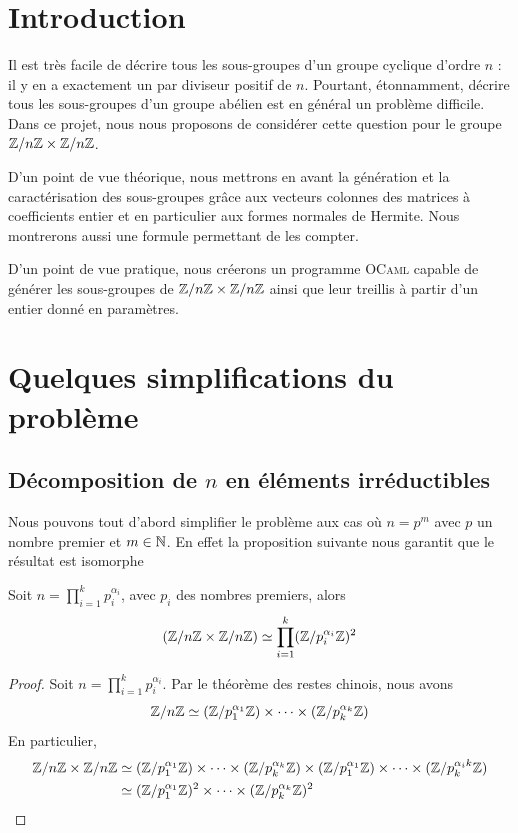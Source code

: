 \documentclass[12pt]{article}
\begin{document}

\hfill
\thispagestyle{empty}
\newpage
\tableofcontents
\newpage
\section{Introduction}
Il est très facile de décrire tous les sous-groupes d'un groupe cyclique
d'ordre $n$ : il y en a exactement un par diviseur positif de $n$.
Pourtant, étonnamment, décrire tous les sous-groupes d'un groupe abélien
est en général un problème difficile.
Dans ce projet, nous nous proposons de considérer cette question pour le groupe $\mathbb Z/n\mathbb Z \times \mathbb Z/n\mathbb Z$.

D'un point de vue théorique, nous mettrons en avant la génération et la
caractérisation des sous-groupes grâce aux vecteurs colonnes des matrices à coefficients entier et en particulier
aux formes normales de Hermite. Nous montrerons aussi une formule permettant de les compter.

D'un point de vue pratique, nous créerons un programme \textsc{OCaml} capable de générer les
sous-groupes de $\mathbb Z/n\mathbb Z \times \mathbb Z/n\mathbb Z$ ainsi que leur treillis à partir d'un entier donné en paramètres.

\newpage
\section{Quelques simplifications du problème}
\subsection{Décomposition de $n$ en éléments irréductibles}\label{theoreme_chinois}

Nous pouvons tout d'abord simplifier le problème aux cas où $n = p^m$ avec $p$ un nombre premier
et $m \in \mathbb N$. En effet la proposition suivante nous garantit que le résultat est isomorphe
\begin{proposition}
	Soit $n = \prod\limits_{i = 1}^k p_i^{\alpha_i}$, avec $p_i$ des nombres premiers, alors
	$$(\mathbb Z/n\mathbb Z \times \mathbb Z/n\mathbb Z) \simeq \prod_{i = 1}^k(\mathbb Z/p_i^{\alpha_i}\mathbb Z)^2$$
\end{proposition}

\begin{proof}
	Soit $n = \prod\limits_{i = 1}^k p_i^{\alpha_i}$. Par le théorème des restes chinois, nous avons
	$$ \mathbb Z/n\mathbb Z \simeq (\mathbb Z/p_1^{\alpha_1}\mathbb Z) \times \cdots \times (\mathbb Z/p_k^{\alpha_k}\mathbb Z)$$
	En particulier,
	\begin{equation*}
		\begin{split}
			\ZZ & \isom
			(\Z/p_1^{\alpha_1}\Z) \x \cdots \x (\Z/p_k^{\alpha_k}\Z) \x (\Z/p_1^{\alpha_1}\Z)%
			\x \cdots \x (\Z/p_k^{\alpha_ik}\Z)\\
			& \isom (\Z/p_1^{\alpha_1}\Z)^2 \x \cdots \x (\Z/p_k^{\alpha_k}\Z)^2
		\end{split}
	\end{equation*}
\end{proof}
\end{document}
